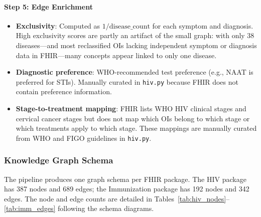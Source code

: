 \paragraph{Step 5: Edge Enrichment}
\begin{itemize}
    \item \textbf{Exclusivity}: Computed as $1 / \mathrm{disease\_count}$ for each symptom and diagnosis. High exclusivity scores are partly an artifact of the small graph: with only 38 diseases---and most reclassified OIs lacking independent symptom or diagnosis data in FHIR---many concepts appear linked to only one disease.
    \item \textbf{Diagnostic preference}: WHO-recommended test preference (e.g., NAAT is preferred for STIs). Manually curated in \texttt{hiv.py} because FHIR does not contain preference information.
    \item \textbf{Stage-to-treatment mapping}: FHIR lists WHO HIV clinical stages and cervical cancer stages but does not map which OIs belong to which stage or which treatments apply to which stage. These mappings are manually curated from WHO and FIGO guidelines in \texttt{hiv.py}.
\end{itemize}

\subsubsection{Knowledge Graph Schema}
\label{sec:kg_schema}

The pipeline produces one graph schema per FHIR package. The HIV package has 387 nodes and 689 edges; the Immunization package has 192 nodes and 342 edges. The node and edge counts are detailed in Tables~\ref{tab:hiv_nodes}--\ref{tab:imm_edges} following the schema diagrams.

